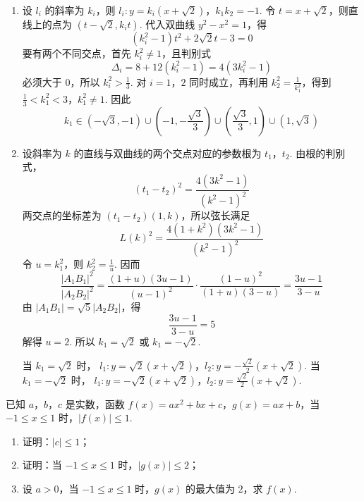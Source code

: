 \begin{solution}
\begin{enumerate}
\item 设 \(l_i\) 的斜率为 \(k_i\)，则
\(l_i:y=k_i\left(x+\sqrt2\right)\)，\(k_1k_2=-1\).
令 \(t=x+\sqrt2\)，则直线上的点为 \((t-\sqrt2,k_it)\). 代入双曲线 \(y^2-x^2=1\)，得
\[
(k_i^2-1)t^2+2\sqrt2t-3=0
\]
要有两个不同交点，首先 \(k_i^2\neq1\)，且判别式
\[
\Delta_i=8+12(k_i^2-1)=4(3k_i^2-1)
\]
必须大于 \(0\)，所以 \(k_i^2>\frac13\). 对 \(i=1\)，\(2\) 同时成立，再利用 \(k_2^2=\frac{1}{k_1^2}\)，得到
\(\frac13<k_1^2<3\)，\(k_1^2\neq1\).
因此
\[
k_1\in\left(-\sqrt3,-1\right)\cup\left(-1,-\frac{\sqrt3}{3}\right)
\cup\left(\frac{\sqrt3}{3},1\right)\cup\left(1,\sqrt3\right)
\]

\item 设斜率为 \(k\) 的直线与双曲线的两个交点对应的参数根为 \(t_1\)，\(t_2\). 由根的判别式，
\[
(t_1-t_2)^2=\frac{4(3k^2-1)}{(k^2-1)^2}
\]
两交点的坐标差为 \((t_1-t_2)(1,k)\)，所以弦长满足
\[
L(k)^2=\frac{4(1+k^2)(3k^2-1)}{(k^2-1)^2}
\]
令 \(u=k_1^2\)，则 \(k_2^2=\frac{1}{u}\). 因而
\[
\frac{|A_1B_1|^2}{|A_2B_2|^2}
=\frac{(1+u)(3u-1)}{(u-1)^2}
\cdot\frac{(1-u)^2}{(1+u)(3-u)}
=\frac{3u-1}{3-u}
\]
由 \(|A_1B_1|=\sqrt5|A_2B_2|\)，得
\[
\frac{3u-1}{3-u}=5
\]
解得 \(u=2\). 所以 \(k_1=\sqrt2\) 或 \(k_1=-\sqrt2\).

当 \(k_1=\sqrt2\) 时，
\(l_1:y=\sqrt2\left(x+\sqrt2\right)\)，\(l_2:y=-\frac{\sqrt2}{2}\left(x+\sqrt2\right)\).
当 \(k_1=-\sqrt2\) 时，
\(l_1:y=-\sqrt2\left(x+\sqrt2\right)\)，\(l_2:y=\frac{\sqrt2}{2}\left(x+\sqrt2\right)\).
\end{enumerate}
\end{solution}

\begin{problem}
已知 \(a\)，\(b\)，\(c\) 是实数，函数 \(f(x) = ax^2 + bx + c\)，\(g(x) = ax + b\)，当 \(-1 \leqslant x \leqslant 1\) 时，\(\left|f(x)\right| \leqslant 1\).

\begin{enumerate}
\item 证明：\(\left|c\right| \leqslant 1\)；
\item 证明：当 \(-1 \leqslant x \leqslant 1\) 时，\(\left|g(x)\right| \leqslant 2\)；
\item 设 \(a > 0\)，当 \(-1 \leqslant x \leqslant 1\) 时，\(g(x)\) 的最大值为 \(2\)，求 \(f(x)\).
\end{enumerate}
\end{problem}

